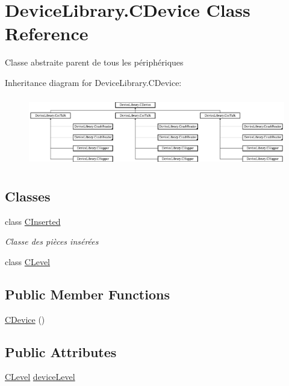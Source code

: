 \hypertarget{class_device_library_1_1_c_device}{}\section{Device\+Library.\+C\+Device Class Reference}
\label{class_device_library_1_1_c_device}


Classe abstraite parent de tous les périphériques  


Inheritance diagram for Device\+Library.\+C\+Device\+:\begin{figure}[H]
\begin{center}
\leavevmode
\includegraphics[height=3.076923cm]{class_device_library_1_1_c_device}
\end{center}
\end{figure}
\subsection*{Classes}
\begin{DoxyCompactItemize}
\item 
class \mbox{\hyperlink{class_device_library_1_1_c_device_1_1_c_inserted}{C\+Inserted}}
\begin{DoxyCompactList}\small\item\em Classe des pièces insérées \end{DoxyCompactList}\item 
class \mbox{\hyperlink{class_device_library_1_1_c_device_1_1_c_level}{C\+Level}}
\end{DoxyCompactItemize}
\subsection*{Public Member Functions}
\begin{DoxyCompactItemize}
\item 
\mbox{\hyperlink{class_device_library_1_1_c_device_a1ea11e47275e8d7baaa1f60a64c41d83}{C\+Device}} ()
\end{DoxyCompactItemize}
\subsection*{Public Attributes}
\begin{DoxyCompactItemize}
\item 
\mbox{\hyperlink{class_device_library_1_1_c_device_1_1_c_level}{C\+Level}} \mbox{\hyperlink{class_device_library_1_1_c_device_ae70218e48d761e45c66226ab7ea40e48}{device\+Level}}
\end{DoxyCompactItemize}
